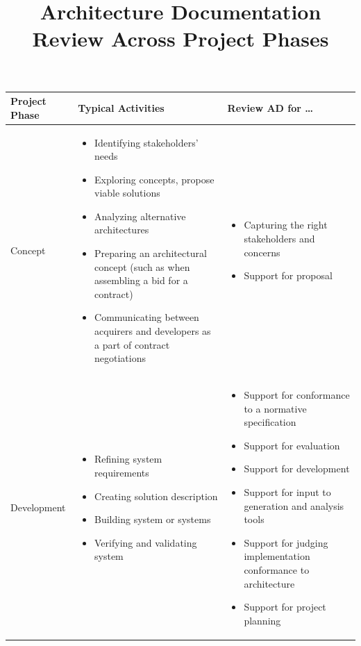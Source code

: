 \documentclass[11pt]{article}
\title{Architecture Documentation Review Across Project Phases}
\author{}
\date{}
\begin{document}
\maketitle

\begin{table}[h!]
  \centering
  \renewcommand{\arraystretch}{1.2}
  \begin{tabularx}{\textwidth}{@{}lXX@{}}
    \toprule
    \textbf{Project Phase} & \textbf{Typical Activities} & \textbf{Review AD for \dots} \\
    \midrule

    Concept &
    \begin{itemize}
      \item Identifying stakeholders' needs
      \item Exploring concepts, propose viable solutions
      \item Analyzing alternative architectures
      \item Preparing an architectural concept (such as when assembling a bid for a contract)
      \item Communicating between acquirers and developers as a part of contract negotiations
    \end{itemize}
    &
    \begin{itemize}
      \item Capturing the right stakeholders and concerns
      \item Support for proposal
    \end{itemize}
    \\[0.5em]

    Development &
    \begin{itemize}
      \item Refining system requirements
      \item Creating solution description
      \item Building system or systems
      \item Verifying and validating system
    \end{itemize}
    &
    \begin{itemize}
      \item Support for conformance to a normative specification
      \item Support for evaluation
      \item Support for development
      \item Support for input to generation and analysis tools
      \item Support for judging implementation conformance to architecture
      \item Support for project planning
    \end{itemize}
    \\[0.5em]


\end{tabularx}
\end{table}
\end{document}
